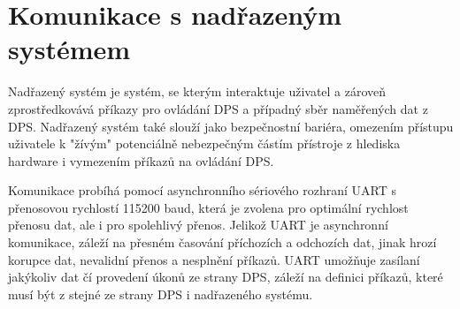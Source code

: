 \section{Komunikace s nadřazeným systémem}
Nadřazený systém je systém, se kterým interaktuje uživatel a zároveň zprostředkovává příkazy pro ovládání DPS a případný sběr naměřených dat z DPS.
Nadřazený systém také slouží jako bezpečnostní bariéra, omezením přístupu uživatele k "žívým" potenciálně nebezpečným částím přístroje z hlediska hardware i vymezením příkazů na ovládání DPS.
\par
Komunikace probíhá pomocí asynchronního sériového rozhraní UART s přenosovou rychlostí 115200 baud, která je zvolena pro optimální rychlost přenosu dat, ale i pro spolehlivý přenos.
Jelikož UART je asynchronní komunikace, záleží na přesném časování příchozích a odchozích dat, jinak hrozí korupce dat, nevalidní přenos a nesplnění příkazů.
UART umožňuje zasílaní jakýkoliv dat čí provedení úkonů ze strany DPS, záleží na definici příkazů, které musí být z stejné ze strany DPS i nadřazeného systému.
